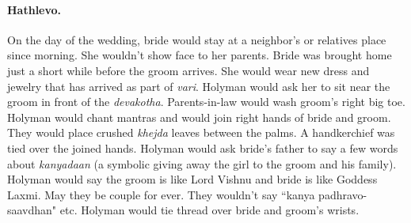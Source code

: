 \paragraph{Hathlevo.} On the day of the wedding, bride would stay at a
neighbor's or relatives place since morning. She wouldn't show face to her
parents. Bride was brought home just a short while before the groom arrives.
She would wear new dress and jewelry that has arrived as part of \textit{vari}.
Holyman would ask her to sit near the groom in front of the \textit{devakotha}.
Parents-in-law would wash groom's right big toe. Holyman would chant mantras
and would join right hands of bride and groom. They would place crushed
\textit{khejda} leaves between the palms. A handkerchief was tied over the
joined hands. Holyman would ask bride's father to say a few words about
\textit{kanyadaan} (a symbolic giving away the girl to the groom and his
family). Holyman would say the groom is like Lord Vishnu and bride is
like Goddess Laxmi. May they be couple for ever. They wouldn't say ``kanya
padhravo-saavdhan" etc. Holyman would tie thread over bride and groom's wrists.

